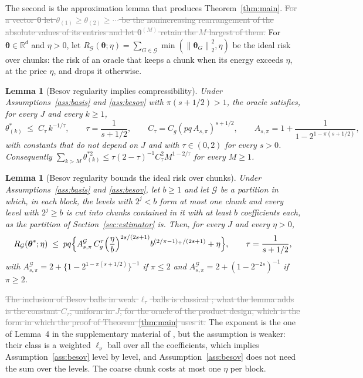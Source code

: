 \documentclass[12pt]{article} %
\newtheorem{lemma}{Lemma}
\theoremstyle{definition}
\theoremstyle{plain}
\newtheorem*{lemmaold}{Lemma}
\newcommand{\R}{\mathbb{R}}
\newcommand{\norm}[1]{\left\lVert #1 \right\rVert}
\newcommand{\lev}{j}
\newcommand{\btheta}{\boldsymbol{\theta}}
\newcommand{\thetastar}{\btheta^{*}}
\newcommand{\Gcal}{\mathcal{G}}
\newcommand{\Rid}{R_{\mathcal{G}}}
\newcommand{\AG}{A^{\mathcal{G}}_{s,\pi}}
\newcommand{\removedk}{\par\noindent[removed in k = 4]\par}
\begin{document}
The second is the approximation lemma that produces Theorem~\ref{thm:main}.
\textcolor{gray}{\sout{For a vector $\btheta$ let $\theta_{(1)} \ge \theta_{(2)} \ge \cdots$ be the
nonincreasing rearrangement of the absolute values of its entries and let
$\btheta^{(M)}$ retain the $M$ largest of them.}}
\textcolor{colR1}{For $\btheta \in \R^{d}$ and $\eta > 0$, let
$\Rid(\btheta;\eta) = \sum_{G\in\Gcal}\min(\norm{\btheta_{G}}_{2}^{2},\eta)$
be the ideal risk over chunks: the risk of an oracle that keeps a chunk when
its energy exceeds $\eta$, at the price $\eta$, and drops it otherwise.}

{\color{gray}\removedk
\begin{lemmaold}[Besov regularity implies compressibility]
Under Assumptions~\ref{ass:basis} and \ref{ass:besov} with
$\pi(s+1/2) > 1$, the oracle satisfies, for every $J$ and every
$k \ge 1$,
\[
  \theta^{*}_{(k)} \;\le\; C_\tau\,k^{-1/\tau},
  \qquad \tau = \frac{1}{s+1/2},
  \qquad C_\tau = C_g(pq\,A_{s,\pi})^{s+1/2},
  \qquad A_{s,\pi} = 1 + \frac{1}{1-2^{1-\pi(s+1/2)}},
\]
with constants that do not depend on $J$ and with $\tau \in (0,2)$ for every
$s > 0$. Consequently
$\sum_{k>M}\theta^{*2}_{(k)} \le \tau(2-\tau)^{-1}C_\tau^{2}M^{1-2/\tau}$ for
every $M \ge 1$.
\end{lemmaold}
}
{\color{colR1}
\begin{lemma}[Besov regularity bounds the ideal risk over chunks]
\label{lem:weak}
Under Assumptions~\ref{ass:basis} and \ref{ass:besov}, let $b \ge 1$ and let
$\Gcal$ be a partition in which, in each block, the levels with $2^{\lev} < b$
form at most one chunk and every level with $2^{\lev} \ge b$ is cut into
chunks contained in it with at least $b$ coefficients each, as the partition of
Section~\ref{sec:estimator} is. Then, for every $J$ and every $\eta > 0$,
\[
  \Rid(\thetastar;\eta) \;\le\; pq\Bigl\{\AG\,C_g^{\tau}
  \Bigl(\frac{\eta}{b}\Bigr)^{2s/(2s+1)}b^{(2/\pi-1)_{+}/(2s+1)} + \eta\Bigr\},
  \qquad \tau = \frac{1}{s+1/2},
\]
with $\AG = 2 + \{1-2^{1-\pi(s+1/2)}\}^{-1}$ if $\pi \le 2$ and
$\AG = 2 + (1-2^{-2s})^{-1}$ if $\pi \ge 2$.
\end{lemma}
}

\textcolor{gray}{\sout{The inclusion of Besov balls in weak $\ell_\tau$ balls is classical
\mbox{\citep[Proposition~9.15]{johnstone2019gaussian}}; what the lemma adds is the
constant $C_\tau$, uniform in $J$, for the oracle of the product design, which
is the form in which the proof of Theorem~\mbox{\ref{thm:main}} uses it.}}
\textcolor{colR1}{The exponent is the one of Lemma~4 in the supplementary material
of \citet{Klopp-Pensky-2015}, but the assumption is weaker: their class is a
weighted $\ell_\nu$ ball over all the coefficients, which implies
Assumption~\ref{ass:besov} level by level, and Assumption~\ref{ass:besov} does
not need the sum over the levels. The coarse chunk costs at most one $\eta$
per block.}
\end{document}
